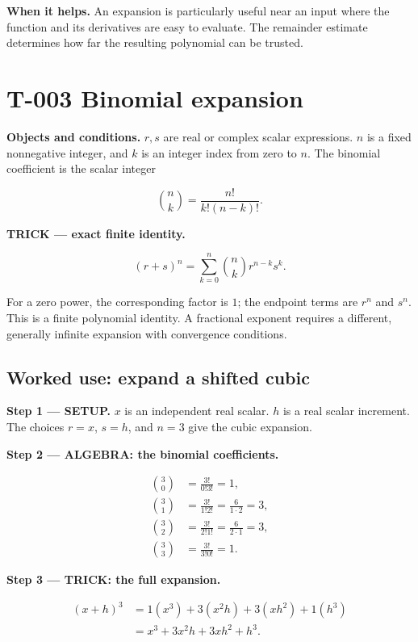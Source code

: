 \documentclass[11pt,oneside,openany]{book}
\begin{document}
\textbf{When it helps.} An expansion is particularly useful near an input where the
function and its derivatives are easy to evaluate. The remainder estimate
determines how far the resulting polynomial can be trusted.

\section{T-003 Binomial expansion}

\textbf{Objects and conditions.} \(r,s\) are real or complex scalar expressions.
\(n\) is a fixed nonnegative integer, and \(k\) is an integer index from zero to \(n\).
The binomial coefficient is the scalar integer

\[
\binom nk=\frac{n!}{k!(n-k)!}.
\]

\textbf{TRICK --- exact finite identity.}

\[
(r+s)^n=\sum_{k=0}^n\binom nk r^{n-k}s^k.
\]

For a zero power, the corresponding factor is \(1\); the endpoint terms are
\(r^n\) and \(s^n\). This is a finite polynomial identity. A fractional exponent
requires a different, generally infinite expansion with convergence conditions.

\subsection{Worked use: expand a shifted cubic}

\textbf{Step 1 --- SETUP.} \(x\) is an independent real scalar. \(h\) is a real scalar
increment. The choices \(r=x\), \(s=h\), and \(n=3\) give the cubic expansion.

\begingroup\color{TrickPurple}
\textbf{Step 2 --- ALGEBRA: the binomial coefficients.}

\[
\begin{aligned}
\binom30&=\frac{3!}{0!3!}=1,\\
\binom31&=\frac{3!}{1!2!}=\frac{6}{1\cdot2}=3,\\
\binom32&=\frac{3!}{2!1!}=\frac{6}{2\cdot1}=3,\\
\binom33&=\frac{3!}{3!0!}=1.
\end{aligned}
\]

\endgroup
\begingroup\color{TrickPurple}
\textbf{Step 3 --- TRICK: the full expansion.}

\[
\begin{aligned}
(x+h)^3
&=1(x^3)+3(x^2h)+3(xh^2)+1(h^3)\\
&=x^3+3x^2h+3xh^2+h^3.
\end{aligned}
\]
\end{document}
